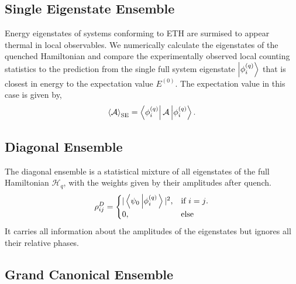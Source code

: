 \subsection{Single Eigenstate Ensemble}
Energy eigenstates of systems conforming to ETH are surmised to appear thermal in local observables. We numerically calculate the eigenstates of the quenched Hamiltonian and compare the experimentally observed local counting statistics to the prediction from the single full system eigenstate $\left|\phi^{(q)}_i\right\rangle$ that is closest in energy to the expectation value $E^{(0)}$. The expectation value in this case is given by,
\[\left\langle \mathcal A\right\rangle_\text{SE} = \left\langle \phi^{(q)}_i\right| \mathcal A \left|\phi^{(q)}_i\right\rangle .\]

\subsection{Diagonal Ensemble}
The diagonal ensemble is a statistical mixture of all eigenstates of the full Hamiltonian $\mathcal H_q$, with the weights given by their amplitudes after quench.
\[
\rho_{ij}^{D}=
\begin{cases}
	|\left\langle \psi_0\left|\phi^{(q)}_i\right.\right\rangle|^2 , & \text{if $i=j$.} \\
	0, & \text{else}
\end{cases}
\]
It carries all information about the amplitudes of the eigenstates but ignores all their relative phases.
%

\subsection{Grand Canonical Ensemble}

